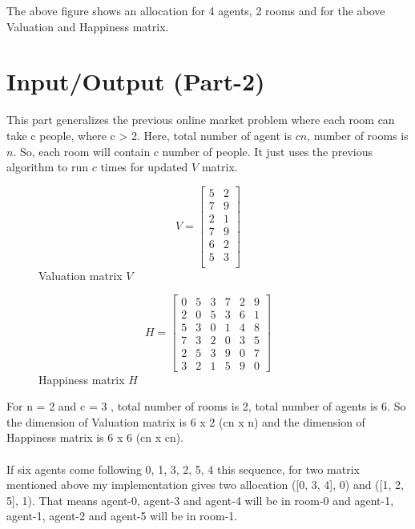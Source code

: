 \documentclass[12pt]{article}
\begin{document}
\noindent
The above figure shows an allocation for 4 agents, 2 rooms and for the above Valuation and Happiness matrix. 
\newpage
\section*{Input/Output (Part-2)}
This part generalizes the previous online market problem where each room can take c people, where c > 2. Here, total number of agent is $cn$, number of rooms is $n$. So, each room will contain $c$ number of people. It just uses the previous algorithm to run $c$ times for updated $V$ matrix.
\begin{figure}[H]
	\begin{minipage}{.5\linewidth}
		\centering
		\[V=\left[\begin{array}{cc}
		5 & 2 \\
		7 & 9 \\
		2 & 1 \\
		7 & 9 \\
		6 & 2 \\
		5 & 3 \\
		\end{array}\right]\]
		Valuation matrix $V$
	\end{minipage}%
	\begin{minipage}{.5\linewidth}
		\centering
		\[H=\left[\begin{array}{cccccc}
		0 & 5 & 3 & 7 & 2 & 9\\
		2 & 0 & 5 & 3 & 6 & 1\\
		5 & 3 & 0 & 1 & 4 & 8\\
		7 & 3 & 2 & 0 & 3 & 5\\
		2 & 5 & 3 & 9 & 0 & 7\\
		3 & 2 & 1 & 5 & 9 & 0
		\end{array}\right]\]
		Happiness matrix $H$
	\end{minipage}
\end{figure}
\noindent
For n = 2 and c = 3 , total number of rooms is 2, total number of agents is 6. So the dimension of Valuation matrix is 6 x 2 (cn x n) and the dimension of Happiness matrix is 6 x 6 (cn x cn).\\\\
\noindent If six agents come following 0, 1, 3, 2, 5, 4 this sequence, for two matrix mentioned above my implementation gives two allocation ([0, 3, 4], 0) and ([1, 2, 5], 1). That means agent-0, agent-3 and agent-4 will be in room-0 and agent-1, agent-1, agent-2 and agent-5 will be in room-1. 
\end{document}
